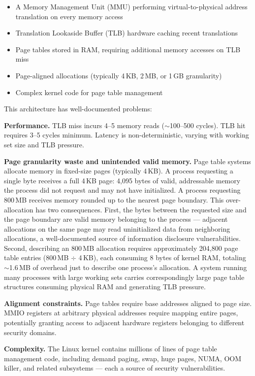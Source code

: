 \documentclass[12pt,letterpaper]{article}
\begin{document}
\begin{itemize}[noitemsep]
  \item A Memory Management Unit (MMU) performing virtual-to-physical
        address translation on every memory access
  \item Translation Lookaside Buffer (TLB) hardware caching recent translations
  \item Page tables stored in RAM, requiring additional memory accesses on TLB miss
  \item Page-aligned allocations (typically 4\,KB, 2\,MB, or 1\,GB granularity)
  \item Complex kernel code for page table management
\end{itemize}

This architecture has well-documented problems:

\textbf{Performance.}
TLB miss incurs 4--5 memory reads ($\sim$100--500 cycles).
TLB hit requires 3--5 cycles minimum.
Latency is non-deterministic, varying with working set size and TLB pressure.

\textbf{Page granularity waste and unintended valid memory.}
Page table systems allocate memory in fixed-size pages (typically 4\,KB).
A process requesting a single byte receives a full 4\,KB page:
4,095 bytes of valid, addressable memory the process did not request
and may not have initialized.
A process requesting 800\,MB receives memory rounded up to the nearest
page boundary.
This over-allocation has two consequences.
First, the bytes between the requested size and the page boundary are
valid memory belonging to the process --- adjacent allocations on the
same page may read uninitialized data from neighboring allocations,
a well-documented source of information disclosure vulnerabilities.
Second, describing an 800\,MB allocation requires approximately 204,800
page table entries (800\,MB $\div$ 4\,KB), each consuming 8 bytes of
kernel RAM, totaling $\sim$1.6\,MB of overhead just to describe one
process's allocation.
A system running many processes with large working sets carries
correspondingly large page table structures consuming physical RAM
and generating TLB pressure.

\textbf{Alignment constraints.}
Page tables require base addresses aligned to page size.
MMIO registers at arbitrary physical addresses require mapping entire pages,
potentially granting access to adjacent hardware registers belonging to different
security domains.

\textbf{Complexity.}
The Linux kernel contains millions of lines of page table management code,
including demand paging, swap, huge pages, NUMA, OOM killer, and related
subsystems --- each a source of security vulnerabilities.
\end{document}
